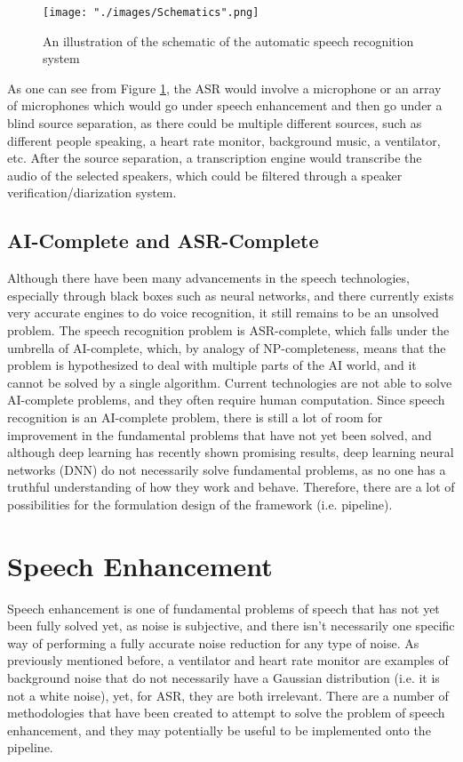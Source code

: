 \begin{figure}[H]
\begin{center}
    \texttt{[image: "./images/Schematics".png]}
    \caption{An illustration of the schematic of the automatic speech recognition system}
    \label{fig::schematics}
\end{center}
\end{figure}

As one can see from Figure \ref{fig::schematics}, the ASR would involve a microphone or an array of microphones which would go under speech enhancement and then go under a blind source separation, as there could be multiple different sources, such as different people speaking, a heart rate monitor, background music, a ventilator, etc. After the source separation, a transcription engine would transcribe the audio of the selected speakers, which could be filtered through a speaker verification/diarization system. 

\subsection{AI-Complete and ASR-Complete}
Although there have been many advancements in the speech technologies, especially through black boxes such as neural networks, and there currently exists very accurate engines to do voice recognition, it still remains to be an unsolved problem. The speech recognition problem is ASR-complete, which falls under the umbrella of AI-complete, which, by analogy of NP-completeness, means that the problem is hypothesized to deal with multiple parts of the AI world, and it cannot be solved by a single algorithm. Current technologies are not able to solve AI-complete problems, and they often require human computation. Since speech recognition is an AI-complete problem, there is still a lot of room for improvement in the fundamental problems that have not yet been solved, and although deep learning has recently shown promising results, deep learning neural networks (DNN) do not necessarily solve fundamental problems, as no one has a truthful understanding of how they work and behave. Therefore, there are a lot of possibilities for the formulation design of the framework (i.e. pipeline).

\section{Speech Enhancement}
Speech enhancement is one of fundamental problems of speech that has not yet been fully solved yet, as noise is subjective, and there isn't necessarily one specific way of performing a fully accurate noise reduction for any type of noise. As previously mentioned before, a ventilator and heart rate monitor are examples of background noise that do not necessarily have a Gaussian distribution (i.e. it is not a white noise), yet, for ASR, they are both irrelevant. There are a number of methodologies that have been created to attempt to solve the problem of speech enhancement, and they may potentially be useful to be implemented onto the pipeline.

